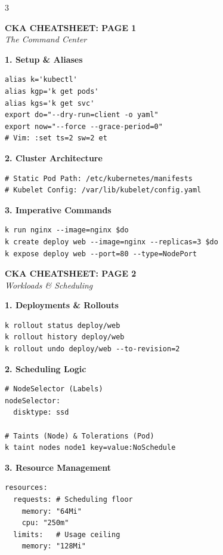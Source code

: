 \documentclass[10pt,landscape]{article}
\newcommand{\sectionheader}[1]{%
    \vspace{2pt}\noindent\colorbox{blue!15}{\parbox{\dimexpr\linewidth-2\fboxsep}{%
    \textbf{#1}}}\vspace{2pt}%
}
\begin{document}
\begin{multicols*}{3}

\begin{center}\textbf{\Large CKA CHEATSHEET: PAGE 1}\\\textit{The Command Center}\end{center}

\sectionheader{1. Setup \& Aliases}
\begin{lstlisting}
alias k='kubectl'
alias kgp='k get pods'
alias kgs='k get svc'
export do="--dry-run=client -o yaml"
export now="--force --grace-period=0"
# Vim: :set ts=2 sw=2 et
\end{lstlisting}

\sectionheader{2. Cluster Architecture}
\begin{lstlisting}
# Static Pod Path: /etc/kubernetes/manifests
# Kubelet Config: /var/lib/kubelet/config.yaml
\end{lstlisting}

\sectionheader{3. Imperative Commands}
\begin{lstlisting}
k run nginx --image=nginx $do
k create deploy web --image=nginx --replicas=3 $do
k expose deploy web --port=80 --type=NodePort
\end{lstlisting}

\columnbreak

\begin{center}\textbf{\Large CKA CHEATSHEET: PAGE 2}\\\textit{Workloads \& Scheduling}\end{center}

\sectionheader{1. Deployments \& Rollouts}
\begin{lstlisting}
k rollout status deploy/web
k rollout history deploy/web
k rollout undo deploy/web --to-revision=2
\end{lstlisting}

\sectionheader{2. Scheduling Logic}
\begin{lstlisting}
# NodeSelector (Labels)
nodeSelector:
  disktype: ssd

# Taints (Node) & Tolerations (Pod)
k taint nodes node1 key=value:NoSchedule
\end{lstlisting}

\sectionheader{3. Resource Management}
\begin{lstlisting}
resources:
  requests: # Scheduling floor
    memory: "64Mi"
    cpu: "250m"
  limits:   # Usage ceiling
    memory: "128Mi"
\end{lstlisting}


\end{multicols*}
\end{document}
